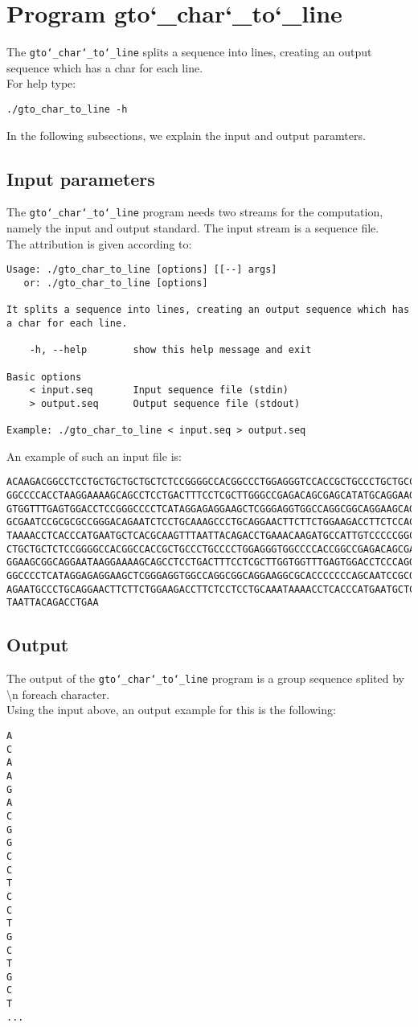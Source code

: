 \section{Program gto\char`_char\char`_to\char`_line}
The \texttt{gto\char`_char\char`_to\char`_line} splits a sequence into lines, creating an output sequence which has a char for each line.\\
For help type:
\begin{lstlisting}
./gto_char_to_line -h
\end{lstlisting}
In the following subsections, we explain the input and output paramters.

\subsection*{Input parameters}

The \texttt{gto\char`_char\char`_to\char`_line} program needs two streams for the computation, namely the input and output standard. The input stream is a sequence file.\\
The attribution is given according to:
\begin{lstlisting}
Usage: ./gto_char_to_line [options] [[--] args]
   or: ./gto_char_to_line [options]

It splits a sequence into lines, creating an output sequence which has a char for each line.

    -h, --help        show this help message and exit

Basic options
    < input.seq       Input sequence file (stdin)
    > output.seq      Output sequence file (stdout)

Example: ./gto_char_to_line < input.seq > output.seq
\end{lstlisting}
An example of such an input file is:
\begin{lstlisting}
ACAAGACGGCCTCCTGCTGCTGCTGCTCTCCGGGGCCACGGCCCTGGAGGGTCCACCGCTGCCCTGCTGCCATTGTCCCC
GGCCCCACCTAAGGAAAAGCAGCCTCCTGACTTTCCTCGCTTGGGCCGAGACAGCGAGCATATGCAGGAAGCGGCAGGAA
GTGGTTTGAGTGGACCTCCGGGCCCCTCATAGGAGAGGAAGCTCGGGAGGTGGCCAGGCGGCAGGAAGCAGGCCAGTGCC
GCGAATCCGCGCGCCGGGACAGAATCTCCTGCAAAGCCCTGCAGGAACTTCTTCTGGAAGACCTTCTCCACCCCCCCAGC
TAAAACCTCACCCATGAATGCTCACGCAAGTTTAATTACAGACCTGAAACAAGATGCCATTGTCCCCCGGCCTCCTGCTG
CTGCTGCTCTCCGGGGCCACGGCCACCGCTGCCCTGCCCCTGGAGGGTGGCCCCACCGGCCGAGACAGCGAGCATATGCA
GGAAGCGGCAGGAATAAGGAAAAGCAGCCTCCTGACTTTCCTCGCTTGGTGGTTTGAGTGGACCTCCCAGGCCAGTGCCG
GGCCCCTCATAGGAGAGGAAGCTCGGGAGGTGGCCAGGCGGCAGGAAGGCGCACCCCCCCAGCAATCCGCGCGCCGGGAC
AGAATGCCCTGCAGGAACTTCTTCTGGAAGACCTTCTCCTCCTGCAAATAAAACCTCACCCATGAATGCTCACGCAAGTT
TAATTACAGACCTGAA
\end{lstlisting}

\subsection*{Output}
The output of the \texttt{gto\char`_char\char`_to\char`_line} program is a group sequence splited by \textbackslash n foreach character.\\
Using the input above, an output example for this is the following:
\begin{lstlisting}
A
C
A
A
G
A
C
G
G
C
C
T
C
C
T
G
C
T
G
C
T
...
\end{lstlisting}